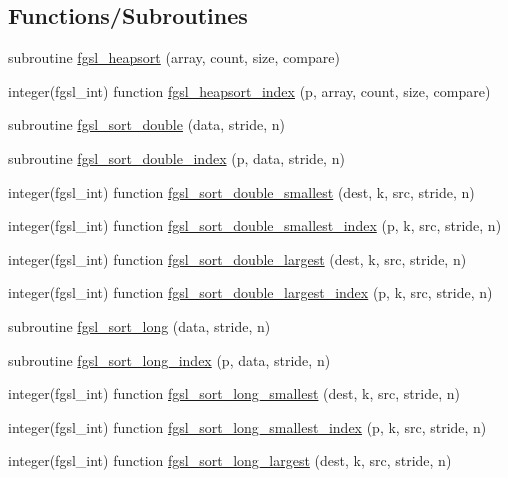 \subsection*{Functions/\-Subroutines}
\begin{DoxyCompactItemize}
\item 
subroutine \hyperlink{sort_8finc_a29c0ed778f056399d921407b94883bb0}{fgsl\-\_\-heapsort} (array, count, size, compare)
\item 
integer(fgsl\-\_\-int) function \hyperlink{sort_8finc_a3f576ca19a0cc0b7cc24ccd80ac5d7d2}{fgsl\-\_\-heapsort\-\_\-index} (p, array, count, size, compare)
\item 
subroutine \hyperlink{sort_8finc_a1dec49e9c2067642bb4a24ccd7939fe4}{fgsl\-\_\-sort\-\_\-double} (data, stride, n)
\item 
subroutine \hyperlink{sort_8finc_adf92649e442927793bb64d8e6c627b64}{fgsl\-\_\-sort\-\_\-double\-\_\-index} (p, data, stride, n)
\item 
integer(fgsl\-\_\-int) function \hyperlink{sort_8finc_a7737cd05792ca6276f0f0abf3ec7e35e}{fgsl\-\_\-sort\-\_\-double\-\_\-smallest} (dest, k, src, stride, n)
\item 
integer(fgsl\-\_\-int) function \hyperlink{sort_8finc_abc3f234c4b7c8fcdb2e5a6ee28c96a84}{fgsl\-\_\-sort\-\_\-double\-\_\-smallest\-\_\-index} (p, k, src, stride, n)
\item 
integer(fgsl\-\_\-int) function \hyperlink{sort_8finc_abbfdbcc768b9fc574bca1aabd5c4ea6f}{fgsl\-\_\-sort\-\_\-double\-\_\-largest} (dest, k, src, stride, n)
\item 
integer(fgsl\-\_\-int) function \hyperlink{sort_8finc_af27bfe3694fe4135ad32cc5d042430da}{fgsl\-\_\-sort\-\_\-double\-\_\-largest\-\_\-index} (p, k, src, stride, n)
\item 
subroutine \hyperlink{sort_8finc_a964150c5e4c1e9126d3e5c133d4cf874}{fgsl\-\_\-sort\-\_\-long} (data, stride, n)
\item 
subroutine \hyperlink{sort_8finc_a6deeedcc9a03ca18bc0fbaddfc4c57bb}{fgsl\-\_\-sort\-\_\-long\-\_\-index} (p, data, stride, n)
\item 
integer(fgsl\-\_\-int) function \hyperlink{sort_8finc_ab63afc3e56f9ed94c784637dc54be97b}{fgsl\-\_\-sort\-\_\-long\-\_\-smallest} (dest, k, src, stride, n)
\item 
integer(fgsl\-\_\-int) function \hyperlink{sort_8finc_ad008a109280ac9782800fdb013a41ce9}{fgsl\-\_\-sort\-\_\-long\-\_\-smallest\-\_\-index} (p, k, src, stride, n)
\item 
integer(fgsl\-\_\-int) function \hyperlink{sort_8finc_a732fd6a26c63eb3ed81178d8dc4dd128}{fgsl\-\_\-sort\-\_\-long\-\_\-largest} (dest, k, src, stride, n)

\end{DoxyCompactItemize}
